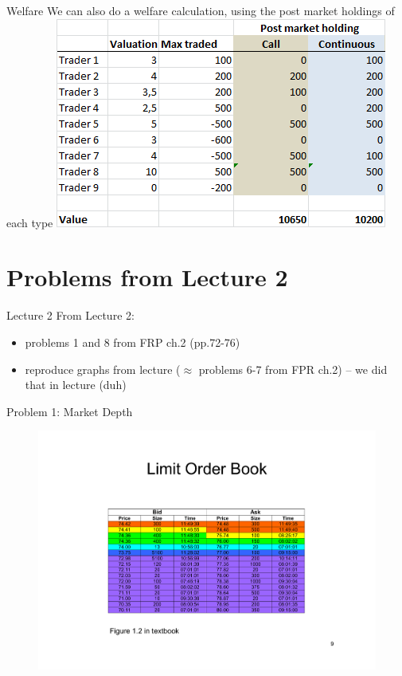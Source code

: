 \begin{frame}{Welfare}
	We can also do a welfare calculation, using the post market holdings of each type
	\quad
	\center
	\includegraphics[width=.6\linewidth]{pics/Welfare}
	\quad
\end{frame}



\section{Problems from Lecture 2}

\begin{frame}{Lecture 2}
From Lecture 2: 
\begin{itemize}
	\item problems 1 and 8 from FRP ch.2 (pp.72-76)
	\item reproduce graphs from lecture ($\approx$ problems 6-7 from FPR ch.2) -- we did that in lecture (duh)
\end{itemize}
\end{frame}


\begin{frame}{Problem 1: Market Depth}
\begin{figure}
	\includegraphics[width=.7\paperwidth]{pics/Image_LOB}
\end{figure}
\end{frame}


